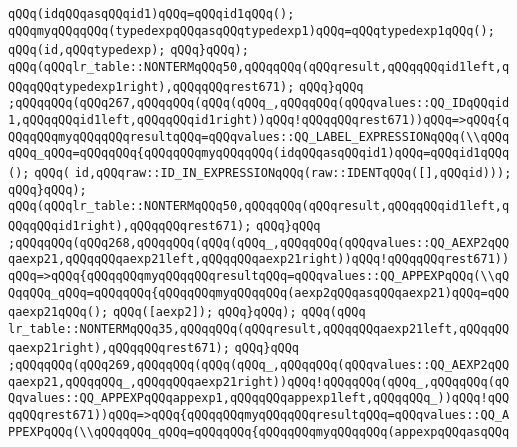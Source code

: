\verb|qQQq(idqQQqasqQQqid1)qQQq=qQQqid1qQQq();|\newline
\verb|qQQqmyqQQqqQQq(typedexpqQQqasqQQqtypedexp1)qQQq=qQQqtypedexp1qQQq();|\newline
\verb|qQQq(id,qQQqtypedexp);|\newline
\verb|qQQq}qQQq);|\newline
\verb|qQQq(qQQqlr_table::NONTERMqQQq50,qQQqqQQq(qQQqresult,qQQqqQQqid1left,qQQqqQQqtypedexp1right),qQQqqQQqrest671);|\newline
\verb|qQQq}qQQq|\newline
\verb|;qQQqqQQq(qQQq267,qQQqqQQq(qQQq(qQQq_,qQQqqQQq(qQQqvalues::QQ_IDqQQqid1,qQQqqQQqid1left,qQQqqQQqid1right))qQQq!qQQqqQQqrest671))qQQq=>qQQq{qQQqqQQqmyqQQqqQQqresultqQQq=qQQqvalues::QQ_LABEL_EXPRESSIONqQQq(\\qQQqqQQq_qQQq=qQQqqQQq{qQQqqQQqmyqQQqqQQq(idqQQqasqQQqid1)qQQq=qQQqid1qQQq();|\newline
\verb|qQQq(|\newline
\verb|id,qQQqraw::ID_IN_EXPRESSIONqQQq(raw::IDENTqQQq([],qQQqid)));|\newline
\verb|qQQq}qQQq);|\newline
\verb|qQQq(qQQqlr_table::NONTERMqQQq50,qQQqqQQq(qQQqresult,qQQqqQQqid1left,qQQqqQQqid1right),qQQqqQQqrest671);|\newline
\verb|qQQq}qQQq|\newline
\verb|;qQQqqQQq(qQQq268,qQQqqQQq(qQQq(qQQq_,qQQqqQQq(qQQqvalues::QQ_AEXP2qQQqaexp21,qQQqqQQqaexp21left,qQQqqQQqaexp21right))qQQq!qQQqqQQqrest671))qQQq=>qQQq{qQQqqQQqmyqQQqqQQqresultqQQq=qQQqvalues::QQ_APPEXPqQQq(\\qQQqqQQq_qQQq=qQQqqQQq{qQQqqQQqmyqQQqqQQq(aexp2qQQqasqQQqaexp21)qQQq=qQQqaexp21qQQq();|\newline
\verb|qQQq([aexp2]);|\newline
\verb|qQQq}qQQq);|\newline
\verb|qQQq(qQQq|\newline
\verb|lr_table::NONTERMqQQq35,qQQqqQQq(qQQqresult,qQQqqQQqaexp21left,qQQqqQQqaexp21right),qQQqqQQqrest671);|\newline
\verb|qQQq}qQQq|\newline
\verb|;qQQqqQQq(qQQq269,qQQqqQQq(qQQq(qQQq_,qQQqqQQq(qQQqvalues::QQ_AEXP2qQQqaexp21,qQQqqQQq_,qQQqqQQqaexp21right))qQQq!qQQqqQQq(qQQq_,qQQqqQQq(qQQqvalues::QQ_APPEXPqQQqappexp1,qQQqqQQqappexp1left,qQQqqQQq_))qQQq!qQQqqQQqrest671))qQQq=>qQQq{qQQqqQQqmyqQQqqQQqresultqQQq=qQQqvalues::QQ_APPEXPqQQq(\\qQQqqQQq_qQQq=qQQqqQQq{qQQqqQQqmyqQQqqQQq(appexpqQQqasqQQq|\newline
